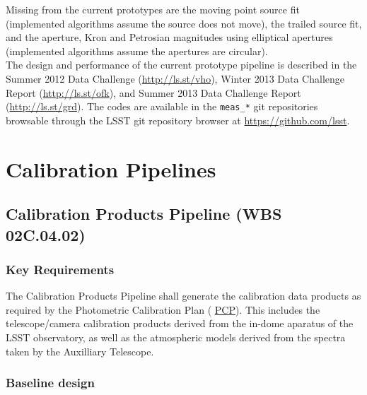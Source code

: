 \documentclass[12pt]{article}
\newcommand{\ds}[2]{{\color{blue} \href{https://docushare.lsstcorp.org/docushare/dsweb/Get/#1}{#2}}\xspace}
\newcommand{\PCP}{\ds{Document-8123}{PCP}}
\newcommand{\wbsCPP}{WBS 02C.04.02}
\begin{document}
Missing from the current prototypes are the moving point source fit (implemented algorithms assume the source does not move), the trailed source fit, and the aperture, Kron and Petrosian magnitudes using elliptical apertures (implemented algorithms assume the apertures are circular).
\\

The design and performance of the current prototype pipeline is described in the Summer 2012 Data Challenge (\url{http://ls.st/vho}), Winter 2013 Data Challenge Report (\url{http://ls.st/ofk}), and Summer 2013 Data Challenge Report (\url{http://ls.st/grd}). The codes are available in the {\tt meas\_*} git repositories browsable through the LSST git repository browser at \url{https://github.com/lsst}.

\clearpage

\section{Calibration Pipelines}

\subsection{Calibration Products Pipeline (\wbsCPP)}

\subsubsection{Key Requirements}

The Calibration Products Pipeline shall generate the calibration data products as required by the Photometric Calibration Plan (\PCP). This includes the telescope/camera calibration products derived from the in-dome aparatus of the LSST observatory, as well as the atmospheric models derived from the spectra taken by the Auxilliary Telescope.

\subsubsection{Baseline design}
\end{document}
